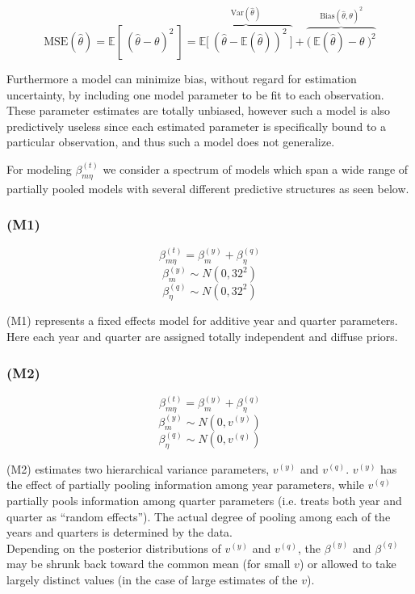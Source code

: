 \documentclass[12pt]{article}
\begin{document}
\[\text{MSE}(\hat\theta) = \mathbb{E}\left[~(\hat\theta - \theta)^2~\right] = \overbrace{\mathbb{E}\Big[~\left(\hat\theta-\mathbb{E}(\hat\theta)\right)^2~\Big]}^{\text{Var}(\hat \theta)} + \overbrace{\Big(~\mathbb{E}(\hat\theta)-\theta~\Big)^2}^{\text{Bias}(\hat \theta, \theta)^2}\]

Furthermore a model can minimize bias, without regard for estimation
uncertainty, by including one model parameter to be fit to each
observation. These parameter estimates are totally unbiased, however
such a model is also predictively useless since each estimated parameter
is specifically bound to a\\
particular observation, and thus such a model does not generalize.

For modeling \(\beta^{(t)}_{m\eta}\) we consider a spectrum of models
which span a wide range of partially pooled models with several
different predictive structures as seen below.

\subsubsection{(M1)}\label{m1}

\[\beta^{(t)}_{m\eta} = \beta^{(y)}_{m} + \beta^{(q)}_{\eta}\]
\[\beta^{(y)}_{m} \sim N(0, 32^2)\]
\[\beta^{(q)}_{\eta} \sim N(0, 32^2)\]

(M1) represents a fixed effects model for additive year and quarter
parameters. Here each year and quarter are assigned totally independent
and diffuse priors.

\subsubsection{(M2)}\label{m2}

\[\beta^{(t)}_{m\eta} = \beta^{(y)}_{m} + \beta^{(q)}_{\eta}\]
\[\beta^{(y)}_{m} \sim N(0, v^{(y)})\]
\[\beta^{(q)}_{\eta} \sim N(0, v^{(q)})\]

(M2) estimates two hierarchical variance parameters, \(v^{(y)}\) and
\(v^{(q)}\). \(v^{(y)}\) has the effect of partially pooling information
among year parameters, while \(v^{(q)}\) partially pools information
among quarter parameters (i.e. treats both year and quarter as ``random
effects''). The actual degree of pooling among each of the years and
quarters is determined by the data.\\
Depending on the posterior distributions of \(v^{(y)}\) and \(v^{(q)}\),
the \(\beta^{(y)}\) and \(\beta^{(q)}\) may be shrunk back toward the
common mean (for small \(v\)) or allowed to take largely distinct values
(in the case of large estimates of the \(v\)).
\end{document}
